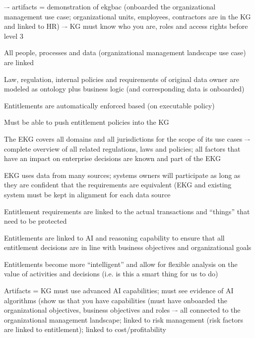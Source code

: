 \begin{scoring}

    \item {} –- artifacts = demonstration of \gls{ekgbac}
          (onboarded the organizational management use case; organizational units, employees, contractors are in
          the KG and linked to HR) –- KG must know who you are, roles and access rights before level 3
    \item All people, processes and data (organizational management landscape use case) are linked
    \item Law, regulation, internal policies and requirements of original data owner are modeled as ontology
          plus business logic (and corresponding data is onboarded)
    \item Entitlements are automatically enforced based (on executable policy)
    \item Must be able to push entitlement policies into the KG
    \item The EKG covers all domains and all jurisdictions for the scope of its use cases –-
          complete overview of all related regulations, laws and policies;
          all factors that have an impact on enterprise decisions are known and part of the EKG
    \item EKG uses data from many sources; systems owners will participate as long as they are confident that
          the requirements are equivalent (EKG and existing system must be kept in alignment for each data source
    \item Entitlement requirements are linked to the actual transactions and “things” that need to be protected

\end{scoring}

\kgmmscoringlevelFour

\begin{scoring}

  \item Entitlements are linked to AI and reasoning capability to ensure that all entitlement decisions are
        in line with business objectives and organizational goals
  \item Entitlements become more “intelligent” and allow for flexible analysis on the value of
        activities and decisions (i.e. is this a smart thing for us to do)
  \item Artifacts = KG must use advanced AI capabilities; must see evidence of AI algorithms
        (show us that you have  capabilities (must have onboarded the organizational objectives,
        business objectives and roles –- all connected to the organizational management landscape;
        linked to risk management (risk factors are linked to entitlement); linked to cost/profitability

\end{scoring}

